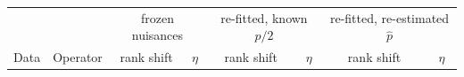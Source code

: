 \begin{tabular}{llcccccc}
\toprule
 & & \multicolumn{2}{c}{frozen nuisances} & \multicolumn{2}{c}{re-fitted, known $p/2$} & \multicolumn{2}{c}{re-fitted, re-estimated $\hat p$}\\
Data & Operator & rank shift & $\eta$ & rank shift & $\eta$ & rank shift & $\eta$\\
\bottomrule
\end{tabular}

